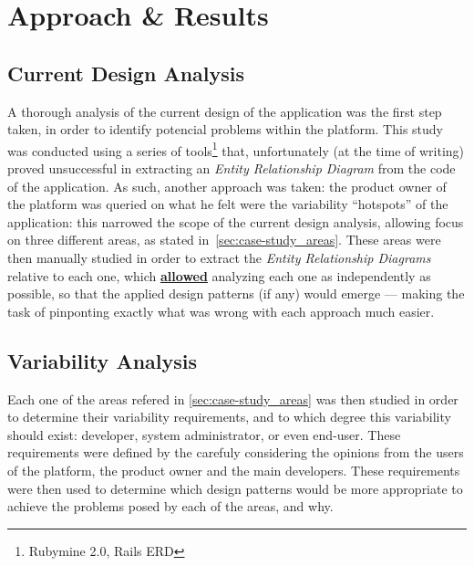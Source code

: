 \chapter{Approach \& Results}\label{chap:approach_results}



\section{Current Design Analysis}\label{sec:current_design_analysis}

A thorough analysis of the current design of the application was the first step taken, in order to identify potencial problems within the platform. This study was conducted using a series of tools\footnote{Rubymine 2.0\cite{rubymine}, Rails ERD\cite{rails_erd}} that, unfortunately (at the time of writing) proved unsuccessful in extracting an \emph{Entity Relationship Diagram} from the code of the application. As such, another approach was taken: the product owner of the platform was queried on what he felt were the variability ``hotspots'' of the application: this narrowed the scope of the current design analysis, allowing focus on three different areas, as stated in~\ref{sec:case-study_areas}. These areas were then manually studied in order to extract the \emph{Entity Relationship Diagrams} relative to each one, which \textbf{\underline{allowed}} analyzing each one as independently as possible, so that the applied design patterns (if any) would emerge --- making the task of pinponting exactly what was wrong with each approach much easier.

\section{Variability Analysis}\label{sec:variability_analysis}

Each one of the areas refered in \ref{sec:case-study_areas} was then studied in order to determine their variability requirements, and to which degree this variability should exist: developer, system administrator, or even end-user. These requirements were defined by the carefuly considering the opinions from the users of the platform, the product owner and the main developers. These requirements were then used to determine which design patterns would be more appropriate to achieve the problems posed by each of the areas, and why.
